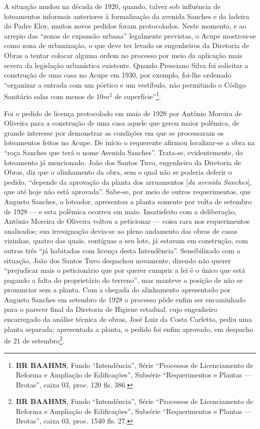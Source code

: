 A situação mudou na década de 1920, quando, talvez sob influência de loteamentos informais anteriores à formalização da avenida Sanches e da ladeira do Padre Eloy, muitos novos pedidos foram protocolados. Neste momento, e ao arrepio das ``zonas de expansão urbana'' legalmente previstas, o Acupe mostrou-se como zona de urbanização, o que deve ter levado os engenheiros da Diretoria de Obras a tentar colocar alguma ordem no processo por meio da aplicação mais severa da legislação urbanística existente. Quando Presciano Silva foi solicitar a construção de uma casa no Acupe em 1930, por exemplo, foi-lhe ordenado ``organizar a entrada com um pórtico e um vestíbulo, não permitindo o Código Sanitário salas com menos de 10$m^{2}$ de superfície''\footnote{\textbf{BR BAAHMS}, Fundo ``Intendência'', Série ``Processos de Licenciamento de Reforma e Ampliação de Edificações'', Subsérie ``Requerimentos e Plantas --- Brotas'', caixa 03, proc. 120 fls. 386.}. 

Foi o pedido de licença protocolado em maio de 1928 por Antônio Moreira de Oliveira para a construção de uma casa aquele que gerou maior polêmica, de grande interesse por demonstrar as condições em que se processaram os loteamentos feitos no Acupe. De início o requerente afirmou localizar-se a obra na ``roça Sanches que terá o nome Avenida Sanches''. Trata-se, evidentemente, do loteamento já mencionado. João dos Santos Tuvo, engenheiro da Diretoria de Obras, diz que o alinhamento da obra, sem o qual não se poderia deferir o pedido, ``depende da aprovação da planta dos arruamentos [\textit{da avenida Sanches}], que até hoje não está aprovada''. Sabe-se, por meio de outros requerimentos, que Augusto Sanches, o loteador, apresentou a planta somente por volta de setembro de 1928 --- e esta polêmica ocorreu em maio. Insatisfeito com a deliberação, Antônio Moreira de Oliveira voltou a peticionar --- coisa rara nos requerimentos analisados; sua irresignação devia-se ao pleno andamento das obras de casas vizinhas, quatro das quais, contíguas a seu lote, já estavam em construção, com outras três ``já habitadas com licença desta Intendência''. Sensibilizado com a situação, João dos Santos Tuvo despachou novamente, dizendo não querer ``prejudicar mais o peticionário que por querer cumprir a lei é o único que está pagando a falta do proprietário do terreno'', mas manteve a posição de não se pronunciar sem a planta. Com a chegada do alinhamento apresentado por Augusto Sanches em setembro de 1928 o processo pôde enfim ser encaminhado para o parecer final da Diretoria de Higiene estadual, cujo engenheiro encarregado da análise técnica de obras, José Luiz da Costa Carletto, pediu uma planta separada; apresentada a planta, o pedido foi enfim aprovado, em despacho de 21 de setembro\footnote{\textbf{BR BAAHMS}, Fundo ``Intendência'', Série ``Processos de Licenciamento de Reforma e Ampliação de Edificações'', Subsérie ``Requerimentos e Plantas --- Brotas'', caixa 03, proc. 1540 fls. 27.}. 

